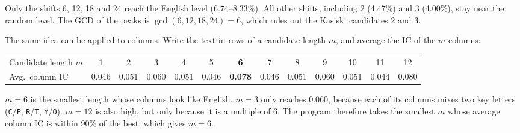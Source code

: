 \documentclass[a4paper, 10pt]{article}
\begin{document}
\begin{problem}
\begin{subproblems_alpha}
\begin{solution}
\begin{center}
		      \end{center}
		      Only the shifts 6, 12, 18 and 24 reach the English level (6.74--8.33\%).
		      All other shifts, including 2 (4.47\%) and 3 (4.00\%), stay near the random level.
		      The GCD of the peaks is $\gcd(6, 12, 18, 24) = 6$, which rules out the Kasiski candidates 2 and 3.

		      The same idea can be applied to columns.
		      Write the text in rows of a candidate length $m$, and average the IC of the $m$ columns:
		      \begin{center}
			      \footnotesize
			      \setlength{\tabcolsep}{2.5pt}
			      \begin{tabular}{l*{12}{c}}
				      \toprule
				      Candidate length $m$ & 1     & 2     & 3     & 4     & 5     & \textbf{6}     & 7     & 8     & 9     & 10    & 11    & 12    \\
				      Avg.\ column IC      & 0.046 & 0.051 & 0.060 & 0.051 & 0.046 & \textbf{0.078} & 0.046 & 0.051 & 0.060 & 0.051 & 0.044 & 0.080 \\
				      \bottomrule
			      \end{tabular}
		      \end{center}
		      $m = 6$ is the smallest length whose columns look like English.
		      $m = 3$ only reaches 0.060, because each of its columns mixes two key letters (\texttt{C}/\texttt{P}, \texttt{R}/\texttt{T}, \texttt{Y}/\texttt{O}).
		      $m = 12$ is also high, but only because it is a multiple of 6.
		      The program therefore takes the smallest $m$ whose average column IC is within 90\% of the best, which gives $m = 6$.


\end{solution}
\end{subproblems_alpha}
\end{problem}
\end{document}
